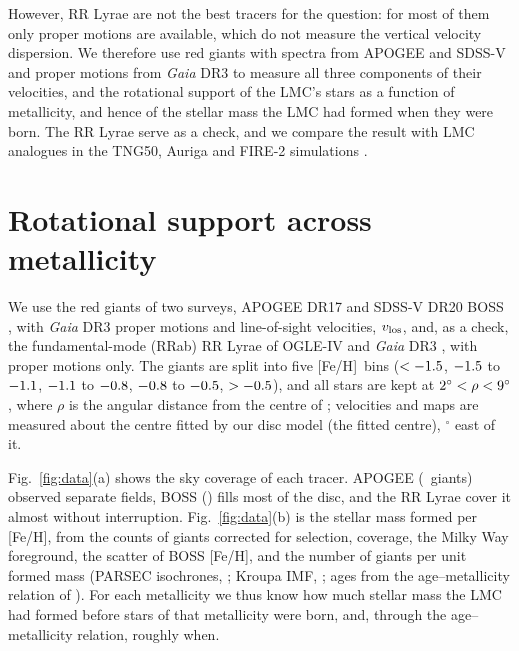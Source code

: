 \documentclass[fleqn,usenatbib,letters]{mnras}
\newcommand{\feh}{[{\rm Fe/H}]}
\begin{document}
However, RR Lyrae are not the best tracers for the question: for most
of them only proper motions are available, which do not measure the
vertical velocity dispersion. We therefore use red giants with spectra
from APOGEE \citep{Majewski2017,Abdurrouf2022} and SDSS-V
\citep{Kollmeier2026,Nidever2026} and proper motions from
\textit{Gaia} DR3 \citep{GaiaCollaboration2023} to measure all three
components of their velocities, and the rotational support of the
LMC's stars as a function of metallicity, and hence of the stellar
mass the LMC had formed when they were born. The RR Lyrae serve as a
check, and we compare the result with LMC analogues in the TNG50,
Auriga and FIRE-2 simulations \citep{Pillepich2019,Grand2024,Wetzel2023}.

\section{Rotational support across metallicity}\label{sec:rotation}

We use the red giants of two surveys, APOGEE DR17
\citep{Majewski2017,Abdurrouf2022} and SDSS-V DR20 BOSS
\citep{Kollmeier2026,Sizemore2024,Nidever2026}, with \textit{Gaia} DR3
proper motions \citep{GaiaCollaboration2023} and line-of-sight
velocities, $v_{\rm los}$, and, as a check, the fundamental-mode (RRab)
RR Lyrae of OGLE-IV and \textit{Gaia} DR3
\citep{Udalski2015,Soszynski2016,Soszynski2019,Clementini2023}, with
proper motions only. The giants are split
into five \feh\ bins ($<-1.5$, $-1.5$ to $-1.1$, $-1.1$ to
$-0.8$, $-0.8$ to $-0.5$, $>-0.5$), and all stars are kept
at $2^\circ<\rho<9^\circ$, where $\rho$ is the angular
distance from the centre of \citet{vanderMarel2014}; velocities and
maps are measured about the centre fitted by our disc model (the
fitted centre), \ltCentreOffset$^\circ$ east of it.

Fig.~\ref{fig:data}(a) shows the sky coverage of each tracer. APOGEE (\ltNApogee\ giants) observed separate fields, BOSS
(\ltNBoss) fills most of the disc, and the RR Lyrae cover it almost
without interruption. Fig.~\ref{fig:data}(b) is the stellar mass formed
per \feh, from the counts of giants corrected for selection, coverage,
the Milky Way foreground, the scatter of BOSS \feh, and the number of
giants per unit formed mass (PARSEC isochrones,
\citealt{Bressan2012,Marigo2017}; Kroupa IMF, \citealt{Kroupa2001};
ages from the age--metallicity relation of \citealt{Povick2024}). For
each metallicity we thus know how much stellar mass the LMC had formed
before stars of that metallicity were born, and, through the
age--metallicity relation, roughly when.
\end{document}
